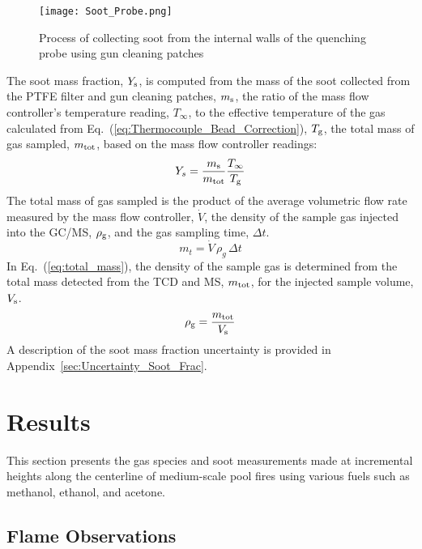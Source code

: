 \documentclass[12pt]{article}
\begin{document}
\begin{figure}[ht!]
	\centering
\texttt{[image: Soot\_Probe.png]}
	\caption[Process for cleaning soot probe]{Process of collecting soot from the internal walls of the quenching probe using gun cleaning patches}
	\label{fig:Soot_Probe_Setup}
\end{figure}

The soot mass fraction, $Y_{\rm s}$, is computed from the mass of the soot collected from the PTFE filter and gun cleaning patches, $m_{\rm s}$, the ratio of the mass flow controller's temperature reading, $T_{\infty}$, to the effective temperature of the gas calculated from Eq.~(\ref{eq:Thermocouple_Bead_Correction}), $T_{\rm g}$, the total mass of gas sampled, $m_{\rm tot}$, based on the mass flow controller readings:
\begin{equation}\label{eq:soot_mass_frac}
Y_{s}= \frac{m_{\rm s}}{m_{\rm tot}}\frac{T_{\infty}}{T_{\rm g}}
\end{equation}
The total mass of gas sampled is the product of the average volumetric flow rate measured by the mass flow controller, $\dot{V}$, the density of the sample gas injected into the GC/MS, $\rho_{\rm g}$, and the gas sampling time, $\Delta t$.
\begin{equation}\label{eq:total_mass}
m_{t}= \dot{V} \, \rho_{g}\, \Delta t
\end{equation}
In Eq.~(\ref{eq:total_mass}), the density of the sample gas is determined from the total mass detected from the TCD and MS, $m_{\rm tot}$, for the injected sample volume, $V_{\rm s}$.
\begin{equation}\label{eq:gas_density}
\rho_{\rm g}= \frac{m_{\rm tot}}{V_{\rm s}}
\end{equation}
A description of the soot mass fraction uncertainty is provided in Appendix~\ref{sec:Uncertainty_Soot_Frac}.




\clearpage

\section{Results}
\label{sec:Results}

This section presents the gas species and soot measurements made at incremental heights along the centerline of medium-scale pool fires using various fuels such as methanol, ethanol, and acetone.

\subsection{Flame Observations}
\label{ssec:Flame_Observations}
\end{document}
